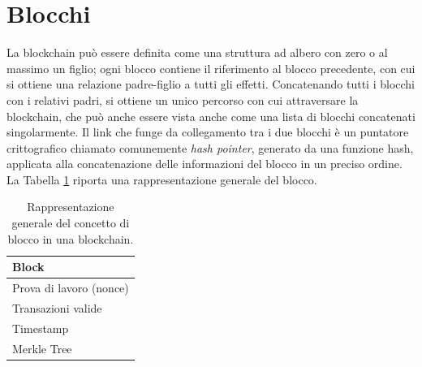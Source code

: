 \section{Blocchi}
\label{sec:blocchiBlockchain}

La blockchain può essere definita come una struttura ad albero con zero o al massimo un figlio; ogni blocco contiene il riferimento al blocco precedente, con cui si ottiene una relazione padre-figlio a tutti gli effetti.
Concatenando tutti i blocchi con i relativi padri, si ottiene un unico percorso con cui attraversare la blockchain, che può anche essere vista anche come una lista di blocchi concatenati singolarmente.
Il link che funge da collegamento tra i due blocchi è un puntatore crittografico chiamato comunemente {\it hash pointer\/}, generato da una funzione hash, applicata alla concatenazione delle informazioni del blocco in un preciso ordine. La Tabella \ref{tab:bitcoinblock} riporta una rappresentazione generale del blocco.


\begin{table}[ht]
       \centering\small
           \begin{tabular}{l}
               \toprule
               Block\\
               \midrule
               Prova di lavoro (nonce)   \\
               Transazioni valide \\
               Timestamp \\
               Merkle Tree \\
               \bottomrule
       \end{tabular}
       \caption{Rappresentazione generale del concetto di blocco in una blockchain.\label{tab:bitcoinblock}}
   \end{table}

